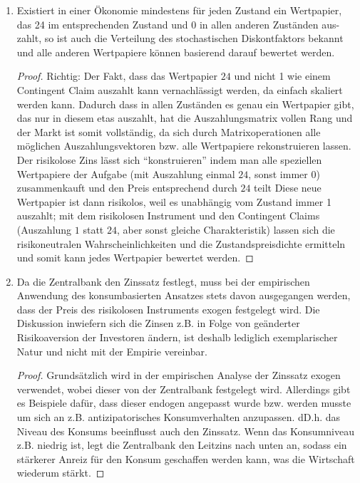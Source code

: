 \documentclass[12pt]{extreport} %
\theoremstyle{named}
\theoremstyle{nnamed}
\theoremstyle{itshape}
\theoremstyle{normal}
\begin{document}
\begin{enumerate}
\begin{proof}
		\end{proof}
	\item Existiert in einer Ökonomie mindestens für jeden Zustand ein Wertpapier, das 24 im entsprechenden Zustand und 0 in allen anderen Zuständen aus-zahlt, so ist auch die Verteilung des stochastischen Diskontfaktors bekannt und alle anderen Wertpapiere können basierend darauf bewertet werden.
		\begin{proof}
			Richtig: Der Fakt, dass das Wertpapier $24$ und nicht 1 wie einem Contingent Claim auszahlt kann vernachlässigt werden, da einfach skaliert werden kann. Dadurch dass in allen Zuständen es genau ein Wertpapier gibt, das nur in diesem etas auszahlt, hat die Auszahlungsmatrix vollen Rang und der Markt ist somit vollständig, da sich durch Matrixoperationen alle möglichen Auszahlungsvektoren bzw. alle Wertpapiere rekonstruieren lassen. Der risikolose Zins lässt sich \enquote{konstruieren} indem man alle speziellen Wertpapiere der Aufgabe (mit Auszahlung einmal $24$, sonst immer $0$) zusammenkauft und den Preis entsprechend durch $24$ teilt  Diese neue Wertpapier ist dann risikolos, weil es unabhängig vom Zustand immer 1 auszahlt; mit dem risikolosen Instrument und den Contingent Claims (Auszahlung $1$ statt $24$, aber sonst gleiche Charakteristik) lassen sich die risikoneutralen Wahrscheinlichkeiten und die Zustandspreisdichte ermitteln und somit kann jedes Wertpapier bewertet werden.
		\end{proof}
	\item Da die Zentralbank den Zinssatz festlegt, muss bei der empirischen Anwendung des konsumbasierten Ansatzes stets davon ausgegangen werden, dass der Preis des risikolosen Instruments exogen festgelegt wird. Die Diskussion inwiefern sich die Zinsen z.B. in Folge von geänderter Risikoaversion der Investoren ändern, ist deshalb lediglich exemplarischer Natur und nicht mit der Empirie vereinbar. 
		\begin{proof}
			Grundsätzlich wird in der empirischen Analyse der Zinssatz exogen verwendet, wobei dieser von der Zentralbank festgelegt wird. Allerdings gibt es Beispiele dafür, dass dieser endogen angepasst wurde bzw. werden musste um sich an z.B. antizipatorisches Konsumverhalten anzupassen. dD.h. das Niveau des Konsums beeinflusst auch den Zinssatz. Wenn das Konsumniveau z.B. niedrig ist, legt die Zentralbank den Leitzins nach unten an, sodass ein stärkerer Anreiz für den Konsum geschaffen werden kann, was die Wirtschaft wiederum stärkt. 
		\end{proof}
\end{enumerate}
\end{document}
